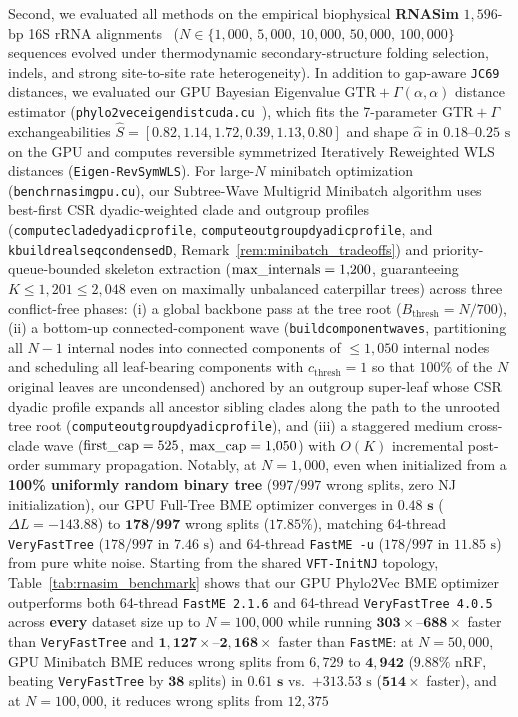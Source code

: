 \documentclass[11pt,a4paper]{article}
\makeatletter
\DeclareRobustCommand{\_}{\ifmmode\nfss@text{\textunderscore}\else\textunderscore\allowbreak\fi}
\theoremstyle{definition}
\makeatother
\begin{document}
Second, we evaluated all methods on the empirical biophysical \textbf{RNASim} $1{,}596$-bp 16S rRNA alignments~\cite{mirarab2015pasta} ($N \in \{1{,}000, \, 5{,}000, \, 10{,}000, \, 50{,}000, \, 100{,}000\}$ sequences evolved under thermodynamic secondary-structure folding selection, indels, and strong site-to-site rate heterogeneity). In addition to gap-aware \texttt{JC69} distances, we evaluated our GPU Bayesian Eigenvalue $\text{GTR}+\Gamma(\alpha,\alpha)$ distance estimator (\texttt{phylo2vec\_eigen\_dist\_cuda.cu}~\cite{penn2025eigen}), which fits the 7-parameter $\text{GTR}+\Gamma$ exchangeabilities $\hat{S} = [0.82, 1.14, 1.72, 0.39, 1.13, 0.80]$ and shape $\hat{\alpha}$ in $0.18\text{--}0.25\text{ s}$ on the GPU and computes reversible symmetrized Iteratively Reweighted WLS distances (\texttt{Eigen-RevSymWLS}). For large-$N$ minibatch optimization (\texttt{bench\_rnasim\_gpu.cu}), our Subtree-Wave Multigrid Minibatch algorithm uses best-first CSR dyadic-weighted clade and outgroup profiles (\texttt{compute\_clade\_dyadic\_profile}, \texttt{compute\_outgroup\_dyadic\_profile}, and \texttt{k\_build\_real\_seq\_condensed\_D}, Remark~\ref{rem:minibatch_tradeoffs}) and priority-queue-bounded skeleton extraction ($\text{max\_internals} = 1{,}200$, guaranteeing $K \le 1{,}201 \le 2{,}048$ even on maximally unbalanced caterpillar trees) across three conflict-free phases: (i) a global backbone pass at the tree root ($B_{\text{thresh}} = N/700$), (ii) a bottom-up connected-component wave (\texttt{build\_component\_waves}, partitioning all $N-1$ internal nodes into connected components of $\le 1{,}050$ internal nodes and scheduling all leaf-bearing components with $c_{\text{thresh}} = 1$ so that $100\%$ of the $N$ original leaves are uncondensed) anchored by an outgroup super-leaf whose CSR dyadic profile expands all ancestor sibling clades along the path to the unrooted tree root (\texttt{compute\_outgroup\_dyadic\_profile}), and (iii) a staggered medium cross-clade wave ($\text{first\_cap} = 525$, $\text{max\_cap} = 1{,}050$) with $O(K)$ incremental post-order summary propagation. Notably, at $N = 1{,}000$, even when initialized from a \textbf{100\% uniformly random binary tree} ($997/997$ wrong splits, zero NJ initialization), our GPU Full-Tree BME optimizer converges in $\mathbf{0.48\text{ s}}$ ($\Delta L = -143.88$) to $\mathbf{178/997}$ wrong splits ($17.85\%$), matching 64-thread \texttt{VeryFastTree} ($178/997$ in $7.46\text{ s}$) and 64-thread \texttt{FastME -u} ($178/997$ in $11.85\text{ s}$) from pure white noise. Starting from the shared \texttt{VFT-InitNJ} topology, Table~\ref{tab:rnasim_benchmark} shows that our GPU Phylo2Vec BME optimizer outperforms both 64-thread \texttt{FastME 2.1.6} and 64-thread \texttt{VeryFastTree 4.0.5} across \textbf{every} dataset size up to $N = 100{,}000$ while running $\mathbf{303\times\text{--}688\times}$ faster than \texttt{VeryFastTree} and $\mathbf{1{,}127\times\text{--}2{,}168\times}$ faster than \texttt{FastME}: at $N = 50{,}000$, GPU Minibatch BME reduces wrong splits from $6{,}729$ to $\mathbf{4{,}942}$ ($\mathbf{9.88\%}$ nRF, beating \texttt{VeryFastTree} by $\mathbf{38}$ splits) in $\mathbf{0.61\text{ s}}$ vs.\ $+313.53\text{ s}$ ($\mathbf{514\times}$ faster), and at $N = 100{,}000$, it reduces wrong splits from $12{,}375$ 
\end{document}
